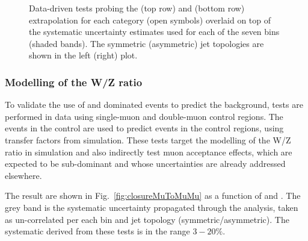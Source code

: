 \begin{figure}[h!]
\begin{center}
    \caption{Data-driven tests probing the \alphat (top row) and \bdphi (bottom row) extrapolation for each
      \njet category (open symbols) overlaid on top of the systematic
      uncertainty estimates used for each of the seven \scalht bins (shaded bands). 
      The symmetric (asymmetric) jet topologies are shown in the left (right) plot. 
    }
    \label{fig:closureAlphaT}
  \end{center} 
\end{figure}



\subsubsection*{Modelling of the W/Z ratio}
\label{sec:tfSyst_WZratio}
To validate the use of \wmj and \ttbar dominated \mj events to predict the \znunu
background, tests are performed in data using single-muon and double-muon control regions. 
The events in the \mj control are used to predict events in the \mmj control regions, 
using transfer factors from simulation. 
These tests target the modelling of the W/Z ratio in simulation and 
also indirectly test muon acceptance effects, which 
are expected to be sub-dominant and whose uncertainties are already addressed elsewhere.

The result are shown in Fig.~\ref{fig:closureMuToMuMu} as a function of \scalht and \njet. 
The grey band is the systematic uncertainty propagated through the analysis, 
taken as un-correlated per each \scalht bin and jet topology (symmetric/asymmetric). The systematic derived from these tests is
in the range $3-20\%$.



